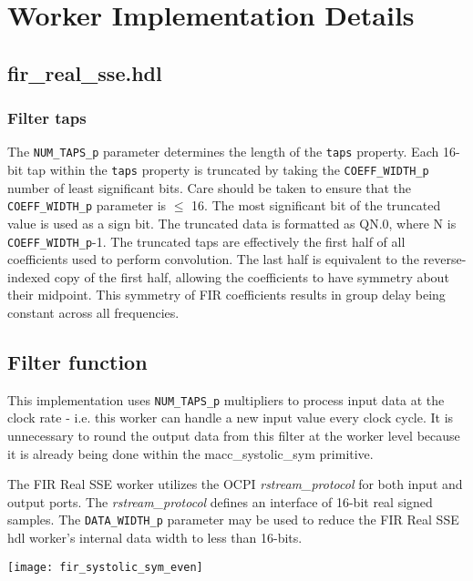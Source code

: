 \documentclass{article}
\def\comp{fir\_real\_sse}
\begin{document}
\section*{Worker Implementation Details}
\subsection*{\comp.hdl}
\subsubsection*{Filter taps}
\begin{flushleft}
	The \verb+NUM_TAPS_p+ parameter determines the length of the \verb+taps+ property.  Each 16-bit tap within the \verb+taps+ property is truncated by taking the \verb+COEFF_WIDTH_p+ number of least significant bits. Care should be taken to ensure that the \verb+COEFF_WIDTH_p+ parameter is $\le$ 16. The most significant bit of the truncated value is used as a sign bit. The truncated data is formatted as QN.0, where N is \verb+COEFF_WIDTH_p+-1. The truncated taps are effectively the first half of all coefficients used to perform convolution. The last half is equivalent to the reverse-indexed copy of the first half, allowing the coefficients to have symmetry about their midpoint. This symmetry of FIR coefficients results in group delay being constant across all frequencies.
\medskip
\end{flushleft}

\subsection*{Filter function}
\begin{flushleft}
	This implementation uses \verb+NUM_TAPS_p+ multipliers to process input data at the clock rate - i.e. this worker can handle a new input value every clock cycle. It is unnecessary to round the output data from this filter at the worker level because it is already being done within the macc\_systolic\_sym primitive.\medskip

	The FIR Real SSE worker utilizes the OCPI \textit{rstream\_protocol} for both input and output ports. The \textit{rstream\_protocol} defines an interface of 16-bit real signed samples. The \verb+DATA_WIDTH_p+ parameter may be used to reduce the FIR Real SSE hdl worker's internal data width to less than 16-bits.
\end{flushleft}
{\centering\captionsetup{type=figure}\texttt{[image: fir\_systolic\_sym\_even]}\par{}\label{fig:circuit}}
\end{document}
